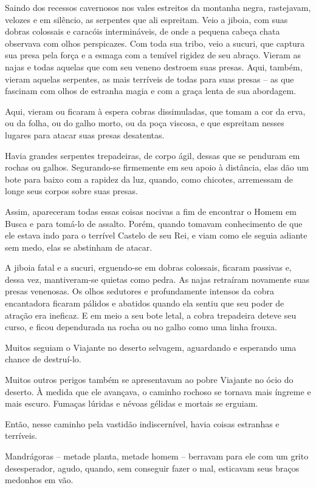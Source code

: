 Saindo dos recessos cavernosos nos vales estreitos da montanha negra,
rastejavam, velozes e em silêncio, as serpentes que ali espreitam. Veio
a jiboia, com suas dobras colossais e caracóis intermináveis, de onde a
pequena cabeça chata observava com olhos perspicazes. Com toda sua
tribo, veio a sucuri, que captura sua presa pela força e a esmaga com a
temível rigidez de seu abraço. Vieram as najas e todas aquelas que com
seu veneno destroem suas presas. Aqui, também, vieram aquelas serpentes,
as mais terríveis de todas para suas presas -- as que fascinam com olhos
de estranha magia e com a graça lenta de sua abordagem.

Aqui, vieram ou ficaram à espera cobras dissimuladas, que tomam a cor da
erva, ou da folha, ou do galho morto, ou da poça viscosa, e que
espreitam nesses lugares para atacar suas presas desatentas.

Havia grandes serpentes trepadeiras, de corpo ágil, dessas que se
penduram em rochas ou galhos. Segurando-se firmemente em seu apoio à
distância, elas dão um bote para baixo com a rapidez da luz, quando,
como chicotes, arremessam de longe seus corpos sobre suas presas.

Assim, apareceram todas essas coisas nocivas a fim de encontrar o Homem
em Busca e para tomá-lo de assalto. Porém, quando tomavam conhecimento
de que ele estava indo para o terrível Castelo de seu Rei, e viam como
ele seguia adiante sem medo, elas se abstinham de atacar.

A jiboia fatal e a sucuri, erguendo-se em dobras colossais, ficaram
passivas e, dessa vez, mantiveram-se quietas como pedra. As najas
retraíram novamente suas presas venenosas. Os olhos sedutores e
profundamente intensos da cobra encantadora ficaram pálidos e abatidos
quando ela sentiu que seu poder de atração era ineficaz. E em meio a seu
bote letal, a cobra trepadeira deteve seu curso, e ficou dependurada na
rocha ou no galho como uma linha frouxa.

Muitos seguiam o Viajante no deserto selvagem, aguardando e esperando
uma chance de destruí-lo.

Muitos outros perigos também se apresentavam ao pobre Viajante no ócio
do deserto. À medida que ele avançava, o caminho rochoso se tornava mais
íngreme e mais escuro. Fumaças lúridas e névoas gélidas e mortais se
erguiam.

Então, nesse caminho pela vastidão indiscernível, havia coisas estranhas
e terríveis.

Mandrágoras -- metade planta, metade homem -- berravam para ele com um
grito desesperador, agudo, quando, sem conseguir fazer o mal, esticavam
seus braços medonhos em vão.

